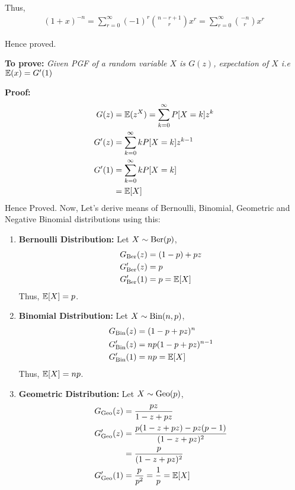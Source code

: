 \begin{solution}
	Thus,
	\begin{align}
		(1+x)^{-n} = \sum_{r=0}^\infty (-1)^r\binom{n-r+1}{r} x^r=
		\sum_{r=0}^\infty \binom{-n}{r}x^r
	\end{align}

	Hence proved.




	\textbf{To prove:} \textit{Given PGF of a random variable $X$ is
		$G(z)$, expectation of $X$ i.e $\mathbb{E}(x) = G'(1)$}

	\textbf{Proof:} \begin{align}
		G(z)  & = \mathbb{E}(z^X) = \sum_{k=0}^\infty P[X=k]z^k \\
		G'(z) & = \sum_{k=0}^\infty kP[X=k]z^{k-1}      \\
		G'(1) & = \sum_{k=0}^\infty kP[X=k]             \\
		      & = \mathbb{E}[X]
	\end{align}
	Hence Proved.
	Now, Let's derive means of Bernoulli, Binomial, Geometric and Negative Binomial
	distributions using this:
	\begin{enumerate}
		\item \textbf{Bernoulli Distribution:} Let $X\sim\text{Ber}(p)$,
		      \begin{align}
			      G_{\text{Ber}}(z)  & = (1-p) + pz \\
			      G'_{\text{Ber}}(z) & = p          \\
			      G'_{\text{Ber}}(1) & = p = \mathbb{E}[X]
		      \end{align}
		      Thus, $\mathbb{E}[X] = p$.
		\item \textbf{Binomial Distribution:} Let $X\sim\text{Bin}(n,p)$,
		      \begin{align}
			      G_{\text{Bin}}(z)  & = (1-p + pz)^n       \\
			      G'_{\text{Bin}}(z) & = np(1-p + pz)^{n-1} \\
			      G'_{\text{Bin}}(1) & = np = \mathbb{E}[X]
		      \end{align}
		      Thus, $\mathbb{E}[X] = np$.
		\item \textbf{Geometric Distribution:} Let $X\sim\text{Geo}(p)$,
		      \begin{align}
			      G_\Geo(z)  & = \frac{pz}{1-z+pz}                      \\
			      G'_\Geo(z) & = \frac{p(1-z+pz) - pz(p-1)}{(1-z+pz)^2} \\
			                 & = \frac{p}{(1-z+pz)^2}                   \\
			      G'_\Geo(1) & = \frac{p}{p^2} = \frac{1}{p} = \E[X]

\end{align}
\end{enumerate}
\end{solution}
